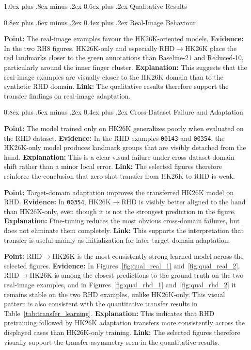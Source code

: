 \documentclass[10pt,letterpaper]{article}
\makeatletter
\renewcommand\subsection{\@startsection{subsection}{2}{\z@}%
  {1.0ex plus .8ex minus .2ex}%
  {0.6ex plus .2ex}%
  {\normalfont\itshape}}
\renewcommand\subsubsection{\@startsection{subsubsection}{3}{\z@}%
  {0.8ex plus .6ex minus .2ex}%
  {0.4ex plus .2ex}%
  {\normalfont\small\itshape}}
\makeatother
\begin{document}
\subsection{Qualitative Results}

\subsubsection{Real-Image Behaviour}

\medskip
\noindent\textbf{Point:} The real-image examples favour the HK26K-oriented models.  
\textbf{Evidence:} In the two RH8 figures, HK26K-only and especially RHD$\rightarrow$HK26K place the red landmarks closer to the green annotations than Baseline-21 and Reduced-10, particularly around the inner finger cluster.  
\textbf{Explanation:} This suggests that the real-image examples are visually closer to the HK26K domain than to the synthetic RHD domain.  
\textbf{Link:} The qualitative results therefore support the transfer findings on real-image adaptation.

\subsubsection{Cross-Dataset Failure and Adaptation}

\medskip
\noindent\textbf{Point:} The model trained only on HK26K generalizes poorly when evaluated on the RHD dataset.  
\textbf{Evidence:} In the RHD examples \texttt{00143} and \texttt{00354}, the HK26K-only model produces landmark groups that are visibly detached from the hand.  
\textbf{Explanation:} This is a clear visual failure under cross-dataset domain shift rather than a minor local error.  
\textbf{Link:} The selected figures therefore reinforce the conclusion that zero-shot transfer from HK26K to RHD is weak.

\medskip
\noindent\textbf{Point:} Target-domain adaptation improves the transferred HK26K model on RHD.  
\textbf{Evidence:} In \texttt{00354}, HK26K$\rightarrow$RHD is visibly better aligned to the hand than HK26K-only, even though it is not the strongest prediction in the figure.  
\textbf{Explanation:} Fine-tuning reduces the most obvious cross-domain failures, but does not eliminate them completely.  
\textbf{Link:} This supports the interpretation that transfer is useful mainly as initialization for later target-domain adaptation.

\medskip
\noindent\textbf{Point:} RHD$\rightarrow$HK26K is the most consistently strong learned model across the selected figures.  
\textbf{Evidence:} In Figures~\ref{fig:qual_real_1} and~\ref{fig:qual_real_2}, RHD$\rightarrow$HK26K is among the closest predictions to the ground truth on the two real-image examples, and in Figures~\ref{fig:qual_rhd_1} and~\ref{fig:qual_rhd_2} it remains stable on the two RHD examples, unlike HK26K-only. This visual pattern is also consistent with the quantitative transfer results in Table~\ref{tab:transfer_learning}.  
\textbf{Explanation:} This indicates that RHD pretraining followed by HK26K adaptation transfers more consistently across the displayed cases than HK26K-only training.  
\textbf{Link:} The selected figures therefore visually support the transfer asymmetry seen in the quantitative results.
\end{document}
